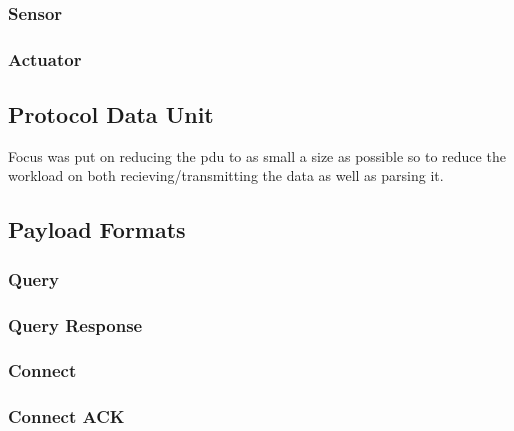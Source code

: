 \documentclass{l4proj}
\begin{document}
\subsubsection{Sensor} %
\label{ssub:sensor}

\subsubsection{Actuator} %
\label{ssub:actuator}




\subsection{Protocol Data Unit} %
\label{sub:protocol_data_unit}
Focus was put on reducing the pdu to as small a size as possible so to reduce the workload on both recieving/transmitting the data as well as parsing it.

\subsection{Payload Formats} %
\label{sub:payload_formats}

\subsubsection{Query} %
\label{ssub:query}
		

\subsubsection{Query Response} %
\label{ssub:query_response}


\subsubsection{Connect} %
\label{ssub:connect}


\subsubsection{Connect ACK} %
\label{ssub:connect_ack}
\end{document}
